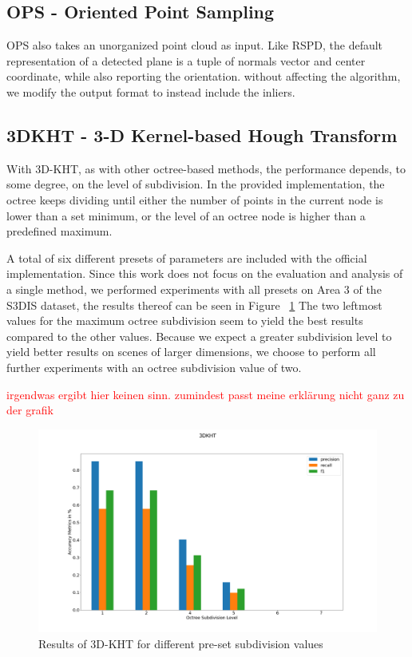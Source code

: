 \documentclass[main.tex]{subfiles}
\begin{document}
\subsection*{OPS - Oriented Point Sampling}
OPS also takes an unorganized point cloud as input. Like RSPD, the default representation of a detected plane is 
a tuple of normals vector and center coordinate, while also reporting the orientation.
without affecting the algorithm, we modify the output format to instead include the inliers. 

\subsection*{3DKHT - 3-D Kernel-based Hough Transform}
With 3D-KHT, as with other octree-based methods, the performance depends, to some degree, on the level of subdivision.
In the provided implementation, the octree keeps dividing until either the number of points in the current node is lower than a set minimum, or the
level of an octree node is higher than a predefined maximum.

A total of six different presets of parameters are included with the official implementation.
Since this work does not focus on the evaluation and analysis of a single method, we performed experiments with all presets on Area 3 of the S3DIS\cite{armeni_cvpr16} dataset, the
results thereof can be seen in Figure ~\ref{fig:3dkht_params}
The two leftmost values for the maximum octree subdivision seem to yield the best results compared to the other values.
Because we expect a greater subdivision level to yield better results on scenes of larger dimensions, we choose to perform 
all further experiments with an octree subdivision value of two.

\textcolor{red}{irgendwas ergibt hier keinen sinn. zumindest passt meine erklärung nicht ganz zu der grafik}

\begin{figure}[!ht]
    \centering
    \includegraphics[width=15 cm]{images/params_3dkht.png}
    \caption{Results of 3D-KHT for different pre-set subdivision values}
    \label{fig:3dkht_params}
\end{figure}
\end{document}
